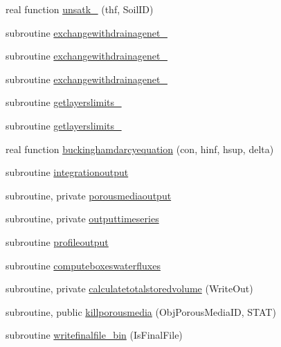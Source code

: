 \begin{DoxyCompactItemize}
\item 
real function \mbox{\hyperlink{namespacemoduleporousmedia_a27a116705cfa7c67ac33a00726529cfa}{unsatk\+\_\+}} (thf, Soil\+ID)
\item 
subroutine \mbox{\hyperlink{namespacemoduleporousmedia_a448128120b85135d0a29b8fbdb5a0b1e}{exchangewithdrainagenet\+\_}}
\item 
subroutine \mbox{\hyperlink{namespacemoduleporousmedia_a7459ca0efe1499228194caae424c0f28}{exchangewithdrainagenet\+\_}}
\item 
subroutine \mbox{\hyperlink{namespacemoduleporousmedia_a3a50b72fe18c884e4924b75c7d58d2c6}{exchangewithdrainagenet\+\_}}
\item 
subroutine \mbox{\hyperlink{namespacemoduleporousmedia_ae9d86bed181ca34fa5ffb39235e588fc}{getlayerslimits\+\_}}
\item 
subroutine \mbox{\hyperlink{namespacemoduleporousmedia_a68ea6f414786e8b58ce6e1091b663f76}{getlayerslimits\+\_}}
\item 
real function \mbox{\hyperlink{namespacemoduleporousmedia_a6c8a46ce1fd00d13bf974507ac525cb8}{buckinghamdarcyequation}} (con, hinf, hsup, delta)
\item 
subroutine \mbox{\hyperlink{namespacemoduleporousmedia_a349fd0e731f948138864367a533ec7aa}{integrationoutput}}
\item 
subroutine, private \mbox{\hyperlink{namespacemoduleporousmedia_a2bde5212b61a523c797e44d2787e0e7d}{porousmediaoutput}}
\item 
subroutine, private \mbox{\hyperlink{namespacemoduleporousmedia_a25ea91b53937b18722679c44410dd4db}{outputtimeseries}}
\item 
subroutine \mbox{\hyperlink{namespacemoduleporousmedia_a929b6fbd1b7c5c387333ef5f2d508c18}{profileoutput}}
\item 
subroutine \mbox{\hyperlink{namespacemoduleporousmedia_ae3a3e980159413f4ef5a35c8b4763aa6}{computeboxeswaterfluxes}}
\item 
subroutine, private \mbox{\hyperlink{namespacemoduleporousmedia_a445b7f7d63644c6c7b90d76b56175868}{calculatetotalstoredvolume}} (Write\+Out)
\item 
subroutine, public \mbox{\hyperlink{namespacemoduleporousmedia_a0935fa1b37d6d9dcbd156944ae27cbe3}{killporousmedia}} (Obj\+Porous\+Media\+ID, S\+T\+AT)
\item 
subroutine \mbox{\hyperlink{namespacemoduleporousmedia_a98c9f7f64e2362f9f4a6d161dc8a7c99}{writefinalfile\+\_\+bin}} (Is\+Final\+File)
\item 

\end{DoxyCompactItemize}

